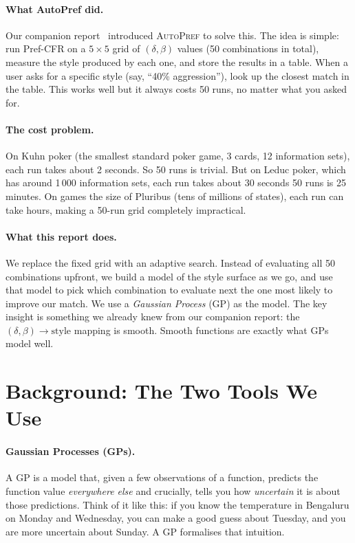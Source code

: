 \documentclass{article}
\begin{document}
\paragraph{What AutoPref did.}
Our companion report~\cite{sayed2025prefcfr} introduced \textsc{AutoPref} to
solve this.  The idea is simple: run Pref-CFR on a $5\times5$ grid of
$(\delta, \beta)$ values (50 combinations in total), measure the style produced
by each one, and store the results in a table.  When a user asks for a
specific style (say, ``40\% aggression''), look up the closest match in the
table.  This works well but it always costs 50 runs, no matter what you
asked for.

\paragraph{The cost problem.}
On Kuhn poker (the smallest standard poker game, 3 cards, 12 information sets),
each run takes about 2 seconds.  So 50 runs is trivial.  But on Leduc poker,
which has around 1\,000 information sets, each run takes about 30 seconds 50
runs is 25 minutes.  On games the size of Pluribus (tens of millions of states),
each run can take hours, making a 50-run grid completely impractical.

\paragraph{What this report does.}
We replace the fixed grid with an adaptive search.  Instead of evaluating all
50 combinations upfront, we build a model of the style surface as we go, and
use that model to pick which combination to evaluate next the one most likely
to improve our match.  We use a \emph{Gaussian Process} (GP) as the model.
The key insight is something we already knew from our companion report: the
$(\delta, \beta) \to \text{style}$ mapping is smooth.  Smooth functions are
exactly what GPs model well.

\section{Background: The Two Tools We Use}
\label{sec:background}

\paragraph{Gaussian Processes (GPs).}
A GP is a model that, given a few observations of a function, predicts the
function value \emph{everywhere else} and crucially, tells you how
\emph{uncertain} it is about those predictions.  Think of it like this: if you
know the temperature in Bengaluru on Monday and Wednesday, you can make a good
guess about Tuesday, and you are more uncertain about Sunday.  A GP formalises
that intuition.
\end{document}
